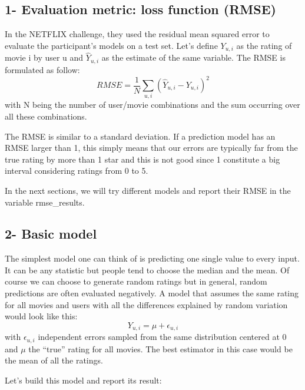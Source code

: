 \documentclass[]{article}
\newenvironment{Shaded}{\begin{snugshade}}{\end{snugshade}}
\newcommand{\KeywordTok}[1]{\textcolor[rgb]{0.13,0.29,0.53}{\textbf{#1}}}
\newcommand{\StringTok}[1]{\textcolor[rgb]{0.31,0.60,0.02}{#1}}
\newcommand{\CommentTok}[1]{\textcolor[rgb]{0.56,0.35,0.01}{\textit{#1}}}
\newcommand{\OperatorTok}[1]{\textcolor[rgb]{0.81,0.36,0.00}{\textbf{#1}}}
\newcommand{\NormalTok}[1]{#1}
\begin{document}
\subsection{1- Evaluation metric: loss function
(RMSE)}\label{evaluation-metric-loss-function-rmse}

In the NETFLIX challenge, they used the residual mean squared error to
evaluate the participant's models on a test set. Let's define
\(Y_{u,i}\) as the rating of movie i by user u and \(\hat{Y}_{u,i}\) as
the estimate of the same variable. The RMSE is formulated as follow:
\[RMSE = \frac{1}{N}\sum_{u,i}\left(\hat{Y}_{u,i} - Y_{u,i}\right)^2\]
with N being the number of user/movie combinations and the sum occurring
over all these combinations.

The RMSE is similar to a standard deviation. If a prediction model has
an RMSE larger than 1, this simply means that our errors are typically
far from the true rating by more than 1 star and this is not good since
1 constitute a big interval considering ratings from 0 to 5.

In the next sections, we will try different models and report their RMSE
in the variable rmse\_results.

\subsection{2- Basic model}\label{basic-model}

The simplest model one can think of is predicting one single value to
every input. It can be any statistic but people tend to choose the
median and the mean. Of course we can choose to generate random ratings
but in general, random predictions are often evaluated negatively. A
model that assumes the same rating for all movies and users with all the
differences explained by random variation would look like this:
\[ Y_{u,i} = \mu + \epsilon_{u,i} \] with \(\epsilon_{u,i}\)
independent errors sampled from the same distribution centered at 0 and
\(\mu\) the ``true'' rating for all movies. The best estimator in this
case would be the mean of all the ratings.

Let's build this model and report its result:

\begin{Shaded}
\end{Shaded}
\end{document}
